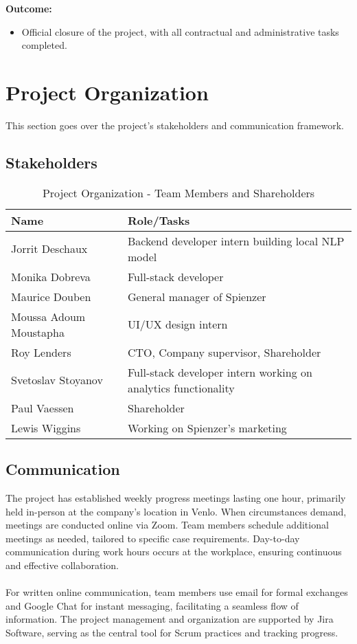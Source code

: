\documentclass[12pt,a4paper]{article}
\begin{document}
\noindent \textbf{Outcome:}
\begin{itemize}
    \item Official closure of the project, with all contractual and administrative tasks completed.
\end{itemize}


\newpage %

\section{Project Organization}
This section goes over the project's stakeholders and communication framework.
\subsection{Stakeholders}


\begin{table}[h!]
\centering
\begin{tabular}{|l|l|}
\hline
\textbf{Name} & \textbf{Role/Tasks} \\
\hline
Jorrit Deschaux & Backend developer intern building local NLP model \\
\hline
Monika Dobreva & Full-stack developer \\
\hline
Maurice Douben & General manager of Spienzer \\
\hline
Moussa Adoum Moustapha & UI/UX design intern \\
\hline
Roy Lenders & CTO, Company supervisor, Shareholder \\
\hline
Svetoslav Stoyanov & Full-stack developer intern working on analytics functionality \\
\hline
Paul Vaessen & Shareholder \\
\hline
Lewis Wiggins & Working on Spienzer’s marketing \\
\hline
\end{tabular}
\caption{Project Organization - Team Members and Shareholders}
\end{table}

\subsection{Communication}
The project has established weekly progress meetings lasting one hour, primarily held in-person at the company's location in Venlo. When circumstances demand, meetings are conducted online via Zoom. Team members schedule additional meetings as needed, tailored to specific case requirements. Day-to-day communication during work hours occurs at the workplace, ensuring continuous and effective collaboration. \\ \\
For written online communication, team members use email for formal exchanges and Google Chat for instant messaging, facilitating a seamless flow of information. The project management and organization are supported by Jira Software, serving as the central tool for Scrum practices and tracking progress.
\end{document}
